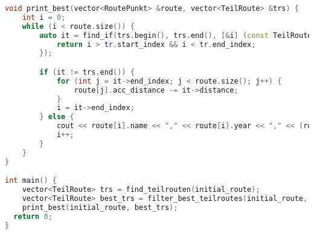 \documentclass[a4paper,10pt,ngerman]{scrartcl}
\begin{document}
\begin{lstlisting}[language=C++]
void print_best(vector<RoutePunkt> &route, vector<TeilRoute> &trs) {
    int i = 0;
    while (i < route.size()) {
        auto it = find_if(trs.begin(), trs.end(), [&i] (const TeilRoute& tr) {
            return i > tr.start_index && i < tr.end_index;
        });

        if (it != trs.end()) {
            for (int j = it->end_index; j < route.size(); j++) {
                route[j].acc_distance -= it->distance;
            }
            i = it->end_index;
        } else {
            cout << route[i].name << "," << route[i].year << "," << (route[i].essential ? 'X' : ' ') << "," << route[i].acc_distance << "\n";
            i++;
        }
    }
}

int main() {
    vector<TeilRoute> trs = find_teilrouten(initial_route);
    vector<TeilRoute> best_trs = filter_best_teilroutes(initial_route, trs);
    print_best(initial_route, best_trs);
  return 0;
}

\end{lstlisting}
\end{document}
